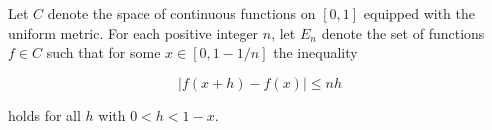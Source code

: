 Let $C$ denote the space of continuous functions on $[0, 1]$ equipped with the uniform metric. For each positive integer $n$, let $E_n$ denote the set of functions $f \in C$ such that for some $x \in [0, 1 - 1/n]$ the inequality

$$|f(x + h) - f(x)| \leq n h$$

holds for all $h$ with $0 < h < 1 - x$.
